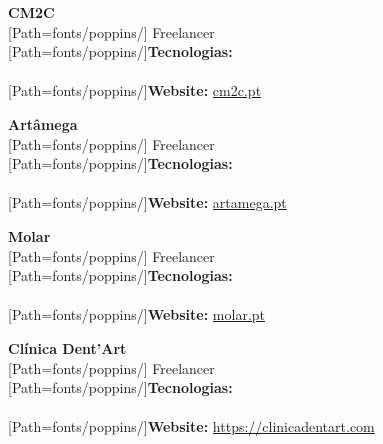 \begin{minipage}{.5\textwidth}
\textbf{CM2C}\\[3pt]
{
	\scriptsize
	[Path=fonts/poppins/]
	Freelancer\\[2pt]

	{[Path=fonts/poppins/]\textbf{Tecnologias:}}\\
	 \\[2pt]

	{[Path=fonts/poppins/]\textbf{Website:}} \href{https://cm2c.pt}{cm2c.pt}
}
\end{minipage}
\begin{minipage}{.5\textwidth}
	\textbf{Artâmega}\\[3pt]
	{
		\scriptsize
		[Path=fonts/poppins/]
		Freelancer\\[2pt]

		{[Path=fonts/poppins/]\textbf{Tecnologias:}}\\
		 \\[2pt]

		{[Path=fonts/poppins/]\textbf{Website:}} \href{https://artamega.pt/}{artamega.pt}
	}
\end{minipage}

\vspace{10pt}

\begin{minipage}{.5\textwidth}
\textbf{Molar}\\[3pt]
{
	\scriptsize
	[Path=fonts/poppins/]
	Freelancer\\[2pt]

	{[Path=fonts/poppins/]\textbf{Tecnologias:}}\\
	 \\[2pt]

	{[Path=fonts/poppins/]\textbf{Website:}} \href{https://molar.pt}{molar.pt}
}
\end{minipage}
\begin{minipage}{.5\textwidth}
	\textbf{Clínica Dent'Art}\\[3pt]
	{
		\scriptsize
		[Path=fonts/poppins/]
		Freelancer\\[2pt]

		{[Path=fonts/poppins/]\textbf{Tecnologias:}}\\
		 \\[2pt]

		{[Path=fonts/poppins/]\textbf{Website:}} \href{https://clinicadentart.com}{https://clinicadentart.com}
	}
\end{minipage}